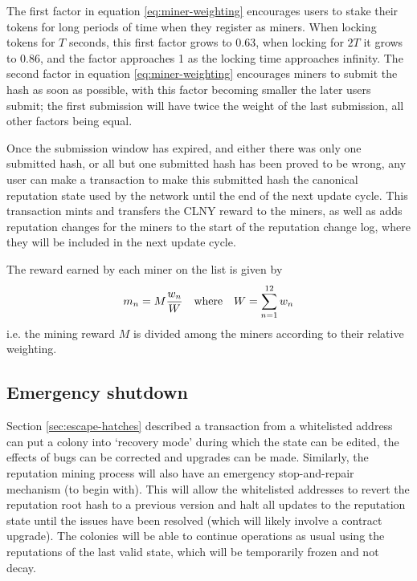 The first factor in equation \eqref{eq:miner-weighting} encourages users to stake their tokens for long periods of time when they register as miners. When locking tokens for $T$ seconds, this first factor grows to 0.63, when locking for $2T$ it grows to 0.86, and the factor approaches 1 as the locking time approaches infinity. The second factor in equation \eqref{eq:miner-weighting} encourages miners to submit the hash as soon as possible, with this factor becoming smaller the later users submit; the first submission will have twice the weight of the last submission, all other factors being equal.

Once the submission window has expired, and either there was only one submitted hash, or all but one submitted hash has been proved to be wrong, any user can make a transaction to make this submitted hash the canonical reputation state used by the network until the end of the next update cycle. This transaction mints and transfers the CLNY reward to the miners, as well as adds reputation changes for the miners to the start of the reputation change log, where they will be included in the next update cycle.

The reward earned by each miner on the list is given by
\begin{equation}\label{eq:miner-payout}
 m_n = M \frac{w_n}{W} \quad \textnormal{where} \quad W = \sum_{n=1}^{12} w_n
\end{equation}
i.e. the mining reward $M$ is divided among the miners according to their relative weighting.


\subsection{Emergency shutdown}\label{sec:big-red-button}
Section \ref{sec:escape-hatches} described a transaction from a whitelisted address can put a colony into `recovery mode' during which the state can be edited, the effects of bugs can be corrected and upgrades can be made. Similarly, the reputation mining process will also have an emergency stop-and-repair mechanism (to begin with). This will allow the whitelisted addresses to revert the reputation root hash to a previous version and halt all updates to the reputation state until the issues have been resolved (which will likely involve a contract upgrade). The colonies will be able to continue operations as usual using the reputations of the last valid state, which will be temporarily frozen and not decay.
